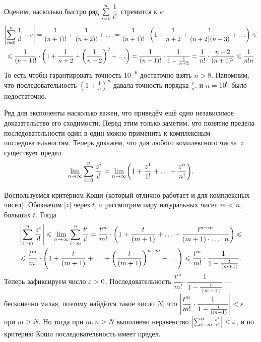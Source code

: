 \documentclass[a4paper,12pt]{article}
\begin{document}
Оценим, насколько быстро ряд $\sum\limits_{i=0}^{n} \dfrac{1}{i!}$ стремится к $e$:
\vspace{-4mm}
\begin{multline*}
\left|\sum\limits_{i=0}^{n} \dfrac{1}{i!} - e\right|
=
\frac{1}{(n+1)!} + \frac{1}{(n+2)!} + \ldots
=
\frac{1}{(n+1)!} \cdot \biggl(1 + \frac{1}{n+2} + \frac{1}{(n+2)(n+3)} + \ldots\biggr)
\leqslant \\ \leqslant
\frac{1}{(n+1)!} \cdot \biggl(1 + \frac{1}{n+2} + \left(\frac{1}{n+2}\right)^2 + \ldots\biggr)
=
\frac{1}{(n+1)!} \cdot \frac{1}{1-\frac{1}{n+2}}
=
\frac{1}{n!} \cdot \frac{n+2}{(n+1)^2}
\leqslant
\frac{1}{n!n}
\end{multline*}
То есть чтобы гарантировать точность $10^{-6}$ достаточно взять $n>8$.
Напомним, что последовательность $(1+\frac1n)^n$ давала точность порядка $\frac{e}{n}$, и $n=10^6$ было недостаточно.

\smallskip
Ряд для экспоненты насколько важен, что приведём ещё одно независимое доказательство его сходимости.
Перед этим только заметим, что понятие предела последовательности один в один можно применить к комплексным последовательностям.
Теперь докажем, что для любого комплексного числа~$z$ существует предел
\vspace*{-3mm}
$$\limn \sumizn \dfrac{z^i}{i!}
=
\limn \bbr{ 1 + \dfrac{z^1}{1!} + \ldots +  \dfrac{z^n}{n!}}.
\vspace{-4mm}
$$


Воспользуемся критерием Коши (который отлично работает и для комплексных чисел).
Обозначим $|z|$ через $t$, и рассмотрим пару натуральных чисел $m<n$, больших $t$.
Тогда
\vspace{-4mm}
\begin{multline*}
\left|\sum_{i=m}^n \dfrac{z^i}{i!}\right|
\leqslant
\lim\limits_{n \rightarrow \infty} \sum_{i=m}^n \dfrac{t^i}{i!}
=
\frac{t^m}{m!}\cdot\left(1 + \dfrac{t}{(m+1)} + \ldots + \dfrac{t^{n-m}}{(m+1)\cdot\ldots\cdot n}\right)
\leqslant\\\leqslant
\frac{t^m}{m!}\cdot\left(1 + \dfrac{t}{(m+1)} + \ldots + \left(\dfrac{t}{(m+1)}\right)^{n-m} + \ldots\right)
\leqslant
\frac{t^m}{m!}\cdot\dfrac{1}{1-\frac{t}{(m+1)}}.
\end{multline*}
Теперь зафиксируем число $\varepsilon>0$.
Последовательность $\dfrac{t^m}{m!}\cdot\dfrac{1}{1-\frac{t}{(m+1)}}$ --- бесконечно малая, поэтому найдётся такое число
$N$, что $\left|\dfrac{t^m}{m!}\cdot\dfrac{1}{1-\frac{t}{(m+1)}}\right|<\varepsilon$ при $m>N$.
Но тогда при $m,n>N$ выполнено неравенство
$\left|\sum_{i=m}^n \frac{z^i}{i!}\right| < \varepsilon$, и по критерию Коши последовательность имеет предел.
\end{document}
